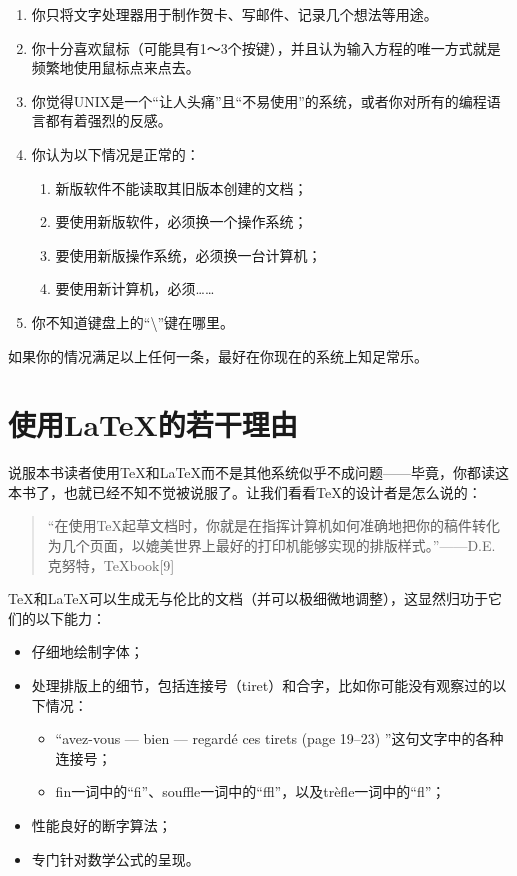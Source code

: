 \begin{enumerate}
    \item 你只将文字处理器用于制作贺卡、写邮件、记录几个想法等用途。
    \item 你十分喜欢鼠标（可能具有1～3个按键），并且认为输入方程的唯一方式就是频繁地使用鼠标点来点去。
    \item 你觉得UNIX是一个“让人头痛”且“不易使用”的系统，或者你对所有的编程语言都有着强烈的反感。
    \item 你认为以下情况是正常的：
        \begin{enumerate}
            \item 新版软件不能读取其旧版本创建的文档；
            \item 要使用新版软件，必须换一个操作系统；
            \item 要使用新版操作系统，必须换一台计算机；
            \item 要使用新计算机，必须……
        \end{enumerate}
    \item 你不知道键盘上的“\backslash”键在哪里。
\end{enumerate}

如果你的情况满足以上任何一条，最好在你现在的系统上知足常乐。

\section*{使用\LaTeX 的若干理由}

说服本书读者使用\TeX 和\LaTeX 而不是其他系统似乎不成问题——毕竟，你都读这本书了，也就已经不知不觉被说服了。让我们看看\TeX 的设计者是怎么说的：

\begin{quote}
    “在使用\TeX 起草文档时，你就是在指挥计算机如何准确地把你的稿件转化为几个页面，以媲美世界上最好的打印机能够实现的排版样式。”——D.E. 克努特，\TeX book[9]
\end{quote}

\TeX 和\LaTeX 可以生成无与伦比的文档（并可以极细微地调整），这显然归功于它们的以下能力：

\begin{itemize}
    \item 仔细地绘制字体；
    \item 处理排版上的细节，包括连接号（tiret）和合字，比如你可能没有观察过的以下情况：
    \begin{itemize}
        \item “avez-vous --- bien --- regardé ces tirets (page 19--23) ”这句文字中的各种连接号；
        \item fin一词中的“f\/i”、souffle一词中的“f\/f\/l”，以及trèfle一词中的“f\/l”；
    \end{itemize}
    \item 性能良好的断字算法；
    \item 专门针对数学公式的呈现。
\end{itemize}

